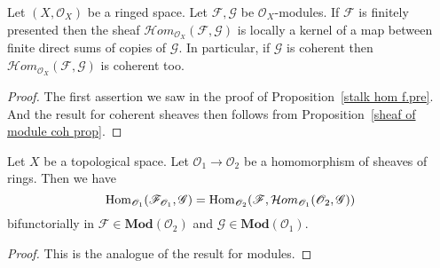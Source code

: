 \begin{proposition}
Let $(X,\mathscr{O}_X)$ be a ringed space. Let $\mathscr{F},\mathscr{G}$ be $\mathscr{O}_{X}$-modules. If $\mathscr{F}$ is finitely presented then the sheaf $\mathcal{H}om_{\mathscr{O}_X}(\mathscr{F},\mathscr{G})$ is locally a kernel of a map between finite direct sums of copies of $\mathscr{G}$. In particular, if $\mathscr{G}$ is coherent then $\mathcal{H}om_{\mathscr{O}_X}(\mathscr{F},\mathscr{G})$ is coherent too.
\end{proposition}
\begin{proof}
The first assertion we saw in the proof of Proposition~\ref{stalk hom f.pre}. And the result for coherent sheaves then follows from Proposition~\ref{sheaf of module coh prop}.
\end{proof}
\begin{proposition}
Let $X$ be a topological space. Let $\mathscr{O}_1\to\mathscr{O}_2$ be a homomorphism of sheaves of rings. Then we have
\[\mathrm{Hom}_{\mathscr{O}_1}(\mathscr{F}_{\mathscr{O}_1},\mathscr{G})=\mathrm{Hom}_{\mathscr{O}_2}(\mathscr{F},\mathcal{H}om_{\mathscr{O}_1}(\mathscr{O}_2,\mathscr{G}))\]
bifunctorially in $\mathscr{F}\in\mathbf{Mod}(\mathscr{O}_2)$ and $\mathscr{G}\in\mathbf{Mod}(\mathscr{O}_1)$.
\end{proposition}
\begin{proof}
This is the analogue of the result for modules.
\end{proof}

